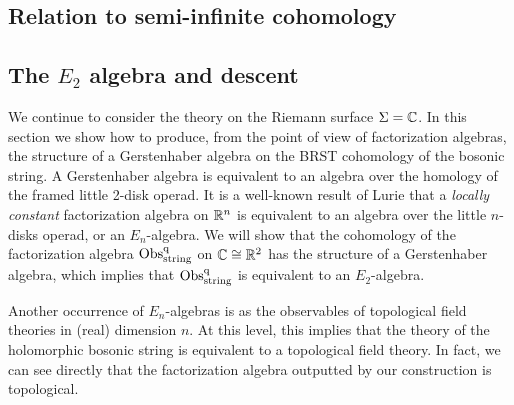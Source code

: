 \subsection{Relation to semi-infinite cohomology}


\subsection{The $E_2$ algebra and descent}

We continue to consider the theory on the Riemann surface $\Sigma = \mathbb C$. 
In this section we show how to produce, from the point of view of factorization algebras, the structure of a Gerstenhaber algebra on the BRST cohomology of the bosonic string. 
A Gerstenhaber algebra is equivalent to an algebra over the homology of the framed little 2-disk operad. 
It is a well-known result of Lurie \cite{Lurie} that a {\em locally constant} factorization algebra on $\mathbb R^n$ is equivalent to an algebra over the little $n$-disks operad, or an $E_n$-algebra. 
We will show that the cohomology of the factorization algebra ${\rm Obs}^{{\rm q}}_{\rm string}$ on $\mathbb C \cong \mathbb R^2$ has the structure of a Gerstenhaber algebra, which implies that ${\rm Obs}^{\rm q}_{\rm string}$ is equivalent to an $E_2$-algebra. 

Another occurrence of $E_n$-algebras is as the observables of topological field theories in (real) dimension $n$. 
At this level, this implies that the theory of the holomorphic bosonic string is equivalent to a topological field theory. 
In fact, we can see directly that the factorization algebra outputted by our construction is topological. 

